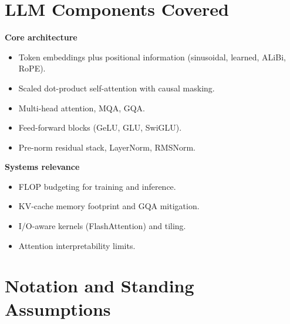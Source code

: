 \section{LLM Components Covered}

\textbf{Core architecture}
\begin{itemize}
  \item Token embeddings plus positional information (sinusoidal,
        learned, ALiBi, RoPE).
  \item Scaled dot-product self-attention with causal masking.
  \item Multi-head attention, MQA, GQA.
  \item Feed-forward blocks (GeLU, GLU, SwiGLU).
  \item Pre-norm residual stack, LayerNorm, RMSNorm.
\end{itemize}

\textbf{Systems relevance}
\begin{itemize}
  \item FLOP budgeting for training and inference.
  \item KV-cache memory footprint and GQA mitigation.
  \item I/O-aware kernels (FlashAttention) and tiling.
  \item Attention interpretability limits.
\end{itemize}

\section{Notation and Standing Assumptions}
\label{sec:ch5-notation}

